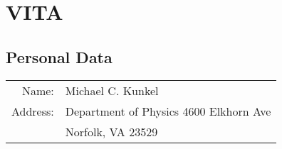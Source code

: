 \documentclass[12pt]{report}
\begin{document}
\begin{singlespacing}

    \clearpage
    
    


\end{singlespacing}
%

\newpage
{}
\let\oldaddtocontents\addtocontents \renewcommand{\addtocontents}[2]{}
\begin{appendices} 

\end{appendices}


\chapter*{VITA}

\section*{Personal Data}

\begin{tabular}{rl}
Name: & Michael C. Kunkel\\
Address: & Department of Physics
 4600 Elkhorn Ave\\
 & Norfolk, VA 23529 
\end{tabular}
\end{document}
